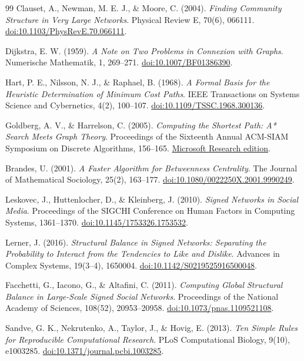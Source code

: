 ﻿\documentclass[a4paper,12pt]{report}
\begin{document}
\begin{thebibliography}{99}
Clauset, A., Newman, M. E. J., \& Moore, C. (2004). \textit{Finding Community Structure in Very Large Networks}. Physical Review E, 70(6), 066111. \href{https://doi.org/10.1103/PhysRevE.70.066111}{doi:10.1103/PhysRevE.70.066111}.

Dijkstra, E. W. (1959). \textit{A Note on Two Problems in Connexion with Graphs}. Numerische Mathematik, 1, 269--271. \href{https://doi.org/10.1007/BF01386390}{doi:10.1007/BF01386390}.

Hart, P. E., Nilsson, N. J., \& Raphael, B. (1968). \textit{A Formal Basis for the Heuristic Determination of Minimum Cost Paths}. IEEE Transactions on Systems Science and Cybernetics, 4(2), 100--107. \href{https://doi.org/10.1109/TSSC.1968.300136}{doi:10.1109/TSSC.1968.300136}.

Goldberg, A. V., \& Harrelson, C. (2005). \textit{Computing the Shortest Path: A* Search Meets Graph Theory}. Proceedings of the Sixteenth Annual ACM-SIAM Symposium on Discrete Algorithms, 156--165. \href{https://www.microsoft.com/en-us/research/publication/computing-the-shortest-path-a-search-meets-graph-theory/}{Microsoft Research edition}.

Brandes, U. (2001). \textit{A Faster Algorithm for Betweenness Centrality}. The Journal of Mathematical Sociology, 25(2), 163--177. \href{https://doi.org/10.1080/0022250X.2001.9990249}{doi:10.1080/0022250X.2001.9990249}.

Leskovec, J., Huttenlocher, D., \& Kleinberg, J. (2010). \textit{Signed Networks in Social Media}. Proceedings of the SIGCHI Conference on Human Factors in Computing Systems, 1361--1370. \href{https://doi.org/10.1145/1753326.1753532}{doi:10.1145/1753326.1753532}.

Lerner, J. (2016). \textit{Structural Balance in Signed Networks: Separating the Probability to Interact from the Tendencies to Like and Dislike}. Advances in Complex Systems, 19(3--4), 1650004. \href{https://doi.org/10.1142/S0219525916500048}{doi:10.1142/S0219525916500048}.

Facchetti, G., Iacono, G., \& Altafini, C. (2011). \textit{Computing Global Structural Balance in Large-Scale Signed Social Networks}. Proceedings of the National Academy of Sciences, 108(52), 20953--20958. \href{https://doi.org/10.1073/pnas.1109521108}{doi:10.1073/pnas.1109521108}.

Sandve, G. K., Nekrutenko, A., Taylor, J., \& Hovig, E. (2013). \textit{Ten Simple Rules for Reproducible Computational Research}. PLoS Computational Biology, 9(10), e1003285. \href{https://doi.org/10.1371/journal.pcbi.1003285}{doi:10.1371/journal.pcbi.1003285}.


\end{thebibliography}
\end{document}
